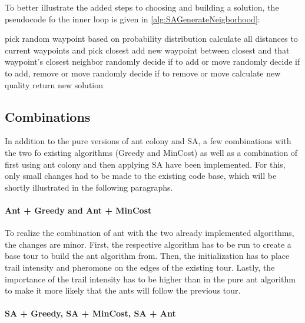 To better illustrate the added steps to choosing and building a solution, the pseudocode fo the inner loop is given in \ref{alg:SAGenerateNeigborhood}:



\begin{breakablealgorithm}
	\caption{Generate neighborhood roundtrip j}
	\label{alg:SAGenerateNeigborhood}
	\begin{algorithmic}[1]
		\STATE pick random waypoint based on probability distribution
		\STATE calculate all distances to current waypoints and pick closest
		\STATE add new waypoint between closest and that waypoint's closest neighbor
		\ELSE {}
		\STATE randomly decide if to add or move
		\ELSE {}
		\STATE randomly decide if to add, remove or move
		\ELSE 
		\STATE randomly decide if to remove or move
		\ENDIF
		\ENDIF
		\ENDIF
		\STATE calculate new quality
		\STATE return new solution
	\end{algorithmic}
\end{breakablealgorithm}


\subsection{Combinations}
\label{subsec:algoCombinations}

In addition to the pure versions of ant colony and SA, a few combinations with the two fo existing algorithms (Greedy and MinCost) as well as a combination of first using ant colony and then applying SA have been implemented.
For this, only small changes had to be made to the existing code base, which will be shortly illustrated in the following paragraphs.

\paragraph{Ant + Greedy and Ant + MinCost}

To realize the combination of ant with the two already implemented algorithms, the changes are minor.
First, the respective algorithm has to be run to create a base tour to build the ant algorithm from.
Then, the initialization has to place trail intensity and pheromone on the edges of the existing tour.
Lastly, the importance of the trail intensity has to be higher than in the pure ant algorithm to make it more likely that the ants will follow the previous tour.


\paragraph{SA + Greedy, SA + MinCost, SA + Ant}

